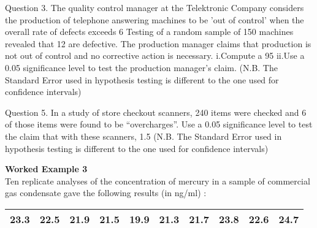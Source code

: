 Question 3.
The quality control manager at the Telektronic Company considers the production of telephone answering machines to be ’out of control’ when the overall rate of defects exceeds 6%
Testing of a random sample of 150 machines revealed that 12 are defective. 
The production manager claims that production is not out of control and no corrective action is necessary.
i.Compute a 95%
ii.Use a 0.05 significance level to test the production manager’s claim.
(N.B. The Standard Error used in hypothesis testing is different to the one used for confidence intervals)



Question 5.
In a study of store checkout scanners, 240 items were checked and 6 of those items were found to be “overcharges”.
Use a 0.05 significance level to test the claim that with these scanners, 1.5 %
(N.B. The Standard Error used in hypothesis testing is different to the one used for confidence intervals)

\item \textbf{Worked Example 3} \\ Ten replicate analyses of the concentration
of mercury in a sample of commercial gas condensate gave the
following results (in ng/ml) :

\begin{tabular}{|c|c|c|c|c|c|c|c|c|c|}
\hline
23.3 & 22.5 & 21.9 & 21.5 & 19.9 & 21.3 & 21.7 & 23.8 & 22.6 &
24.7\\
\hline
\end{tabular}



